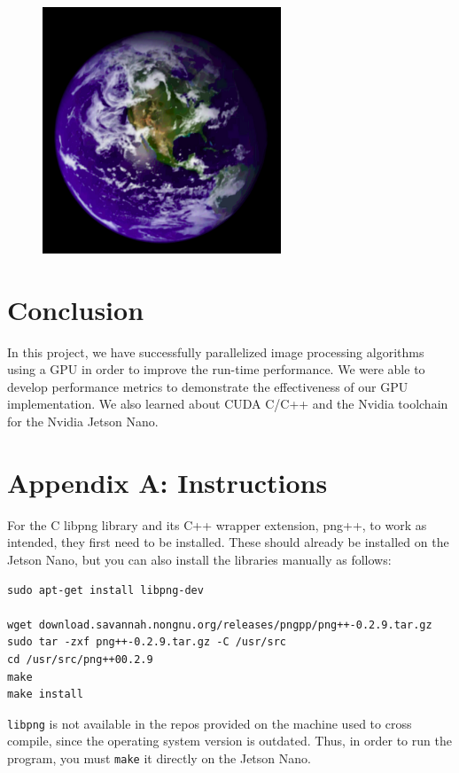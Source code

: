 \documentclass{article}
\begin{document}
\begin{figure}[!htp]
\begin{center}
{        \includegraphics[width=2.8in]{figures/nasa_hybrid.png}
        \label{fig:NASA_hybrid}}
    \end{center}
\end{figure}
\clearpage
\section{Conclusion}

In this project, we have successfully parallelized image processing algorithms using a GPU in order to improve the run-time performance. We were able to develop performance metrics to demonstrate the effectiveness of our GPU implementation. We also learned about CUDA C/C++ and the Nvidia toolchain for the Nvidia Jetson Nano. 

\printbibliography

\clearpage
\section{Appendix A: Instructions}

For the C libpng library and its C++ wrapper extension, png++, to work as intended, they first need to be installed. These should already be installed on the Jetson Nano, but you can also install the libraries manually as follows:
\begin{verbatim}
sudo apt-get install libpng-dev

wget download.savannah.nongnu.org/releases/pngpp/png++-0.2.9.tar.gz
sudo tar -zxf png++-0.2.9.tar.gz -C /usr/src
cd /usr/src/png++00.2.9
make
make install
\end{verbatim}
\texttt{libpng} is not available in the repos provided on the machine used to cross compile, since the operating system version is outdated. Thus, in order to run the program, you must \texttt{make} it directly on the Jetson Nano. 
\end{document}
